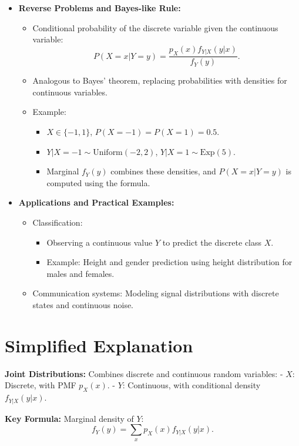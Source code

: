 \documentclass{article}
\begin{document}
\begin{itemize}
  \item \textbf{Reverse Problems and Bayes-like Rule:}
    \begin{itemize}
      \item Conditional probability of the discrete variable given the continuous variable:
        \[
          P(X=x|Y=y) = \frac{p_X(x)f_{Y|X}(y|x)}{f_Y(y)}.
        \]
      \item Analogous to Bayes’ theorem, replacing probabilities with densities for continuous variables.
      \item Example:
        \begin{itemize}
          \item $X \in \{-1, 1\}$, $P(X=-1) = P(X=1) = 0.5$.
          \item $Y|X=-1 \sim \text{Uniform}(-2, 2)$, $Y|X=1 \sim \text{Exp}(5)$.
          \item Marginal $f_Y(y)$ combines these densities, and $P(X=x|Y=y)$ is computed using the formula.
        \end{itemize}
    \end{itemize}

  \item \textbf{Applications and Practical Examples:}
    \begin{itemize}
      \item Classification:
        \begin{itemize}
          \item Observing a continuous value $Y$ to predict the discrete class $X$.
          \item Example: Height and gender prediction using height distribution for males and females.
        \end{itemize}
      \item Communication systems: Modeling signal distributions with discrete states and continuous noise.
    \end{itemize}
\end{itemize}

\section*{Simplified Explanation}

\textbf{Joint Distributions:}
Combines discrete and continuous random variables:
- $X$: Discrete, with PMF $p_X(x)$.
- $Y$: Continuous, with conditional density $f_{Y|X}(y|x)$.

\textbf{Key Formula:}
Marginal density of $Y$:
\[
  f_Y(y) = \sum_{x} p_X(x) f_{Y|X}(y|x).
\]
\end{document}
